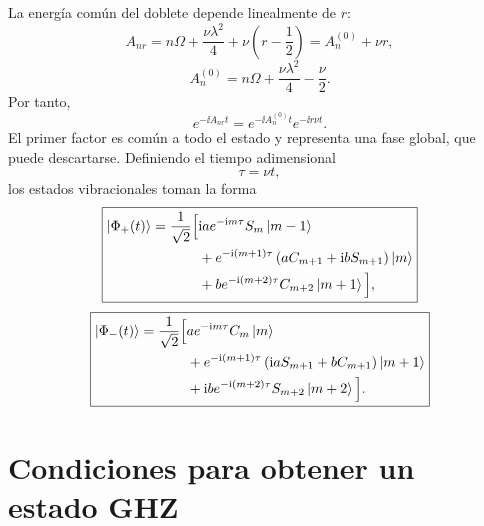 La energ\'ia com\'un del doblete depende linealmente de $r$:
\begin{equation}
  A_{nr}
  =
  n\Omega+\frac{\nu\lambda^2}{4}
  +\nu\left(r-\frac12\right)
  =
  A_n^{(0)}+\nu r,
\end{equation}
\begin{equation}
  A_n^{(0)}
  =
  n\Omega+\frac{\nu\lambda^2}{4}-\frac{\nu}{2}.
\end{equation}
Por tanto,
\begin{equation}
  e^{-\ii A_{nr}t}
  =
  e^{-\ii A_n^{(0)}t}e^{-\ii r\nu t}.
\end{equation}
El primer factor es com\'un a todo el estado y representa una fase global, que
puede descartarse. Definiendo el tiempo adimensional
\begin{equation}
  \tau=\nu t,
\end{equation}
los estados vibracionales toman la forma
\begin{equation}
  \boxed{
  \begin{aligned}
  \ket{\Phi_+(t)}
  =\frac{1}{\sqrt2}\Big[&
  \mathrm{i} a e^{-\mathrm{i} m\tau}S_m\ket{m-1}
  \\
  &+e^{-\mathrm{i}(m+1)\tau}
  \left(aC_{m+1}+\mathrm{i} bS_{m+1}\right)\ket m
  \\
  &+b e^{-\mathrm{i}(m+2)\tau}C_{m+2}\ket{m+1}
  \Big],
  \end{aligned}
  }
\end{equation}
\begin{equation}
  \boxed{
  \begin{aligned}
  \ket{\Phi_-(t)}
  =\frac{1}{\sqrt2}\Big[&
  a e^{-\mathrm{i} m\tau}C_m\ket m
  \\
  &+e^{-\mathrm{i}(m+1)\tau}
  \left(\mathrm{i} aS_{m+1}+bC_{m+1}\right)\ket{m+1}
  \\
  &+\mathrm{i} b e^{-\mathrm{i}(m+2)\tau}S_{m+2}\ket{m+2}
  \Big].
  \end{aligned}
  }
\end{equation}

\section{Condiciones para obtener un estado GHZ}

